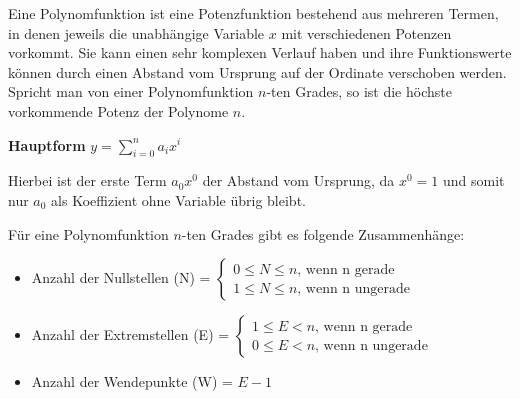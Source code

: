 \begin{figure}[h!]
\centering
\end{figure}


Eine Polynomfunktion ist eine Potenzfunktion bestehend aus mehreren Termen, in denen jeweils die unabh\"{a}ngige Variable $x$ mit verschiedenen Potenzen vorkommt. Sie kann einen sehr komplexen Verlauf haben und ihre Funktionswerte k\"{o}nnen durch einen Abstand vom Ursprung auf der Ordinate verschoben werden.
Spricht man von einer Polynomfunktion $n$-ten Grades, so ist die h\"{o}chste vorkommende Potenz der Polynome $n$.

\textbf{Hauptform}  $y = \sum_{i=0}^{n} a_{i} x^i$

Hierbei ist der erste Term $a_{0}x^0$ der Abstand vom Ursprung, da $x^0 = 1$ und somit nur $a_{0}$ als Koeffizient ohne Variable \"{u}brig bleibt.

F\"{u}r eine Polynomfunktion $n$-ten Grades gibt es folgende Zusammenh\"{a}nge:

\begin{itemize}
	\item Anzahl der Nullstellen (N) =
	      $\begin{cases}
	      	0 \leq N \leq n\text{, wenn n gerade}\\
	      	1 \leq N \leq n\text{, wenn n ungerade}
	      \end{cases}$
	\item Anzahl der Extremstellen (E) = 
		$\begin{cases}
			1 \leq E < n\text{, wenn n gerade}\\
	      	0 \leq E < n\text{, wenn n ungerade}
		 \end{cases}$
	\item Anzahl der Wendepunkte (W) = $E - 1$
\end{itemize}


